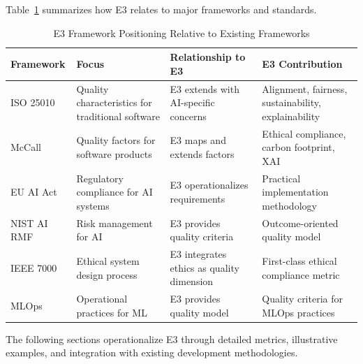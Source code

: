 Table~\ref{tab:framework_comparison} summarizes how E3 relates to major frameworks and standards.

\begin{table}[t]
\centering
\caption{E3 Framework Positioning Relative to Existing Frameworks}
\label{tab:framework_comparison}
\small
\begin{tabularx}{\textwidth}{@{}l X X X@{}}
\toprule
\textbf{Framework} & \textbf{Focus} & \textbf{Relationship to E3} & \textbf{E3 Contribution} \\
\midrule
ISO 25010 & Quality characteristics for traditional software & E3 extends with AI-specific concerns & Alignment, fairness, sustainability, explainability \\
McCall & Quality factors for software products & E3 maps and extends factors & Ethical compliance, carbon footprint, XAI \\
EU AI Act & Regulatory compliance for AI systems & E3 operationalizes requirements & Practical implementation methodology \\
NIST AI RMF & Risk management for AI & E3 provides quality criteria & Outcome-oriented quality model \\
IEEE 7000 & Ethical system design process & E3 integrates ethics as quality dimension & First-class ethical compliance metric \\
MLOps & Operational practices for ML & E3 provides quality model & Quality criteria for MLOps practices \\
\bottomrule
\end{tabularx}
\end{table}

The following sections operationalize E3 through detailed metrics, illustrative examples, and integration with existing development methodologies.